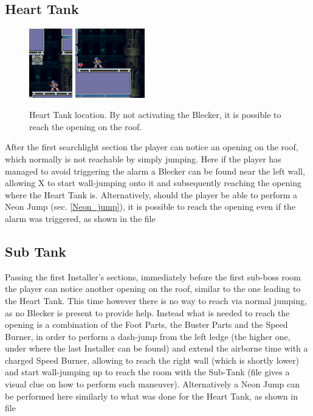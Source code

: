 \subsection{Heart Tank}
\begin{figure}[htp]
	\centering
	\includegraphics[height=3cm]{figures/X2/Magna_centipede/Centipede_heart_1.png}
	\includegraphics[height=3cm]{figures/X2/Magna_centipede/Centipede_heart_2.png}
	\caption{Heart Tank location. By not activating the Blecker, it is possible to reach the opening on the roof.}
\end{figure}
After the first searchlight section the player can notice an opening on the roof, which normally is not reachable by simply jumping. Here if the player has managed to avoid triggering the alarm a Blecker can be found near the left wall, allowing X to start wall-jumping onto it and subsequently reaching the opening where the Heart Tank is. Alternatively, should the player be able to perform a Neon Jump (sec. \ref{Neon_jump}), it is possible to reach the opening even if the alarm was triggered, as shown in the file 

\subsection{Sub Tank}
Passing the first Installer's sections, immediately before the first sub-boss room the player can notice another opening on the roof, similar to the one leading to the Heart Tank. This time however there is no way to reach via normal jumping, as no Blecker is present to provide help. Instead what is needed to reach the opening is a combination of the Foot Parts, the Buster Parts and the Speed Burner, in order to perform a dash-jump from the left ledge (the higher one, under where the last Installer can be found) and extend the airborne time with a charged Speed Burner, allowing to reach the right wall (which is shortly lower) and start wall-jumping up to reach the room with the Sub-Tank (file  gives a visual clue on how to perform such maneuver). Alternatively a Neon Jump can be performed here similarly to what was done for the Heart Tank, as shown in file 

